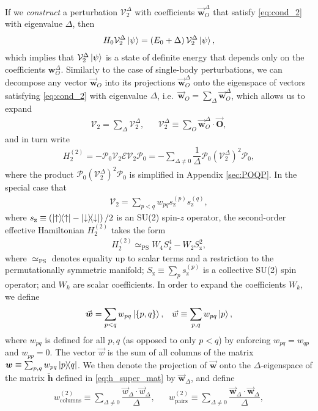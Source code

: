 \documentclass[nofootinbib,notitlepage,11pt]{revtex4-2}
\renewcommand{\t}{\text} %
\newcommand{\f}[2]{\dfrac{#1}{#2}} %
\newcommand{\p}[1]{\left(#1\right)} %
\renewcommand{\set}[1]{\left\{#1\right\}} %
\renewcommand{\c}{\cdot} %
\newcommand{\m}{\bm} %
\renewcommand{\v}{\vec} %
\newcommand{\1}{\mathds{1}}
\newcommand{\up}{\uparrow}
\newcommand{\dn}{\downarrow}
\newcommand{\z}{\text{z}}
\newcommand{\E}{\mathcal{E}}
\renewcommand{\P}{\mathcal{P}}
\newcommand{\V}{\mathcal{V}}
\newcommand{\PS}{\text{PS}}
\begin{document}
If we {\it construct} a perturbation $\V_2^\Delta$ with coefficients
$\v{\m w}_O^\Delta$ that satisfy \eqref{eq:cond_2} with eigenvalue
$\Delta$, then
\begin{align}
  H_0 \V_2^\Delta \ket\psi = \p{E_0 + \Delta} \V_2^\Delta \ket\psi,
\end{align}
which implies that $\V_2^\Delta\ket\psi$ is a state of definite energy
that depends only on the coefficients $\m w_O^\Delta$.  Similarly to
the case of single-body perturbations, we can decompose any vector
$\v{\m w}_O$ into its projections $\v{\m w}_O^\Delta$ onto the
eigenspace of vectors satisfying \eqref{eq:cond_2} with eigenvalue
$\Delta$, i.e.~$\v{\m w}_O=\sum_\Delta\v{\m w}_O^\Delta$, which allows
us to expand
\begin{align}
  \V_2 = \sum_\Delta \V_2^\Delta,
  &&
  \V_2^\Delta \equiv \sum_O \v{\m w}_O^\Delta \c \v{\m O},
\end{align}
and in turn write
\begin{align}
  H_2^{(2)} = - \P_0 \V_2 \E \V_2 \P_0
  = -\sum_{\Delta\ne0} \f1\Delta \P_0 \p{\V_2^\Delta}^2 \P_0,
\end{align}
where the product $\P_0 \p{\V_2^\Delta}^2 \P_0$ is simplified in
Appendix \ref{sec:POQP}.  In the special case that
\begin{align}
  \V_2 = \sum_{p<q} w_{pq} s_\z^{(p)} s_\z^{(q)},
\end{align}
where $s_\z\equiv\p{\op\up-\op\dn}/2$ is an SU(2) spin-$z$ operator,
the second-order effective Hamiltonian $H_2^{(2)}$ takes the form
\begin{align}
  H_2^{(2)} \simeq_\PS W_4 S_\z^4 - W_2 S_\z^2,
\end{align}
where $\simeq_\PS$ denotes equality up to scalar terms and a
restriction to the permutationally symmetric manifold;
$S_\z\equiv\sum_p s_\z^{(p)}$ is a collective SU(2) spin operator; and
$W_k$ are scalar coefficients.  In order to expand the coefficients
$W_k$, we define
\begin{align}
  \v{\m w}=\sum_{p<q} w_{pq} \ket{\set{p,q}},
  &&
  \v w \equiv \sum_{p,q} w_{pq} \ket{p},
\end{align}
where $w_{pq}$ is defined for all $p,q$ (as opposed to only $p<q$) by
enforcing $w_{pq}=w_{qp}$ and $w_{pp}=0$.  The vector $\v w$ is the
sum of all columns of the matrix
$\m w\equiv\sum_{p,q}w_{pq}\op{p}{q}$.  We then denote the projection
of $\v{\m w}$ onto the $\Delta$-eigenspace of the matrix
$\check{\m h}$ defined in \eqref{eq:h_super_mat} by $\v{\m w}_\Delta$,
and define
\begin{align}
  w_{\t{columns}}^{(2)} \equiv \sum_{\Delta\ne0}
  \f{\v w_\Delta\c\v w_\Delta}{\Delta},
  &&
  w_{\t{pairs}}^{(2)} \equiv \sum_{\Delta\ne0}
  \f{\v{\m w}_\Delta\c\v{\m w}_\Delta}{\Delta},
\end{align}
\end{document}
